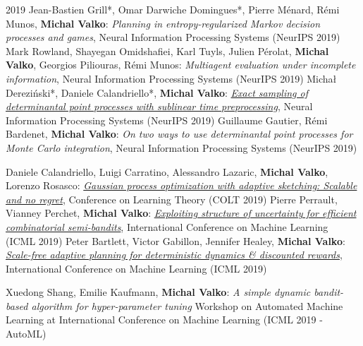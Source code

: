 \documentclass{resume}
\begin{document}
\begin{category}{2019}
\citembullet
Jean-Bastien Grill*, Omar Darwiche Domingues*, Pierre M\'enard, R\'emi Munos, {\bf Michal Valko}: \emph{Planning in entropy-regularized Markov decision processes and games}, Neural Information Processing Systems
({\sf NeurIPS 2019})
\citembullet 
Mark Rowland, Shayegan Omidshafiei, Karl Tuyls, Julien P\'erolat, {\bf Michal Valko}, Georgios Piliouras, R\'emi Munos: \emph{Multiagent evaluation under incomplete information}, Neural Information Processing Systems
({\sf NeurIPS 2019}) 
\citembullet
Micha\l{} Derezi\'nski*, Daniele Calandriello*, {\bf Michal Valko}:
\href{http://researchers.lille.inria.fr/~valko/hp/serve.php?what=publications/derezinski2019exact.pdf}{\emph{Exact sampling of determinantal point processes with sublinear time preprocessing}},
Neural Information Processing Systems
({\sf NeurIPS 2019}) 
\citembullet
Guillaume Gautier, R\' emi Bardenet, {\bf Michal Valko}:
{\emph{On two ways to use determinantal point processes for Monte Carlo integration}},
Neural Information Processing Systems
({\sf NeurIPS 2019}) 

\citembullet
Daniele Calandriello, Luigi Carratino, Alessandro Lazaric,   {\bf Michal Valko}, Lorenzo Rosasco:
\href{http://researchers.lille.inria.fr/~valko/hp/publications/calandriello2019gaussian.pdf}{\emph{Gaussian process optimization with adaptive sketching: Scalable and no regret}},
Conference on Learning Theory
({\sf COLT 2019}) 
\citembullet
Pierre Perrault, Vianney Perchet,   {\bf Michal Valko}:
\href{http://researchers.lille.inria.fr/~valko/hp/serve.php?what=publications/perrault2019exploiting.pdf}{\emph{Exploiting structure of uncertainty for efficient combinatorial semi-bandits}},
International Conference on Machine Learning
({\sf ICML 2019}) 
\citembullet
Peter Bartlett, Victor Gabillon, Jennifer Healey,    {\bf Michal Valko}:
\href{http://researchers.lille.inria.fr/~valko/hp/serve.php?what=publications/bartlett2019scale-free}{
\emph{Scale-free adaptive planning for deterministic dynamics \& discounted rewards}},
International Conference on Machine Learning
({\sf ICML 2019}) 

\citembullet
Xuedong Shang, Emilie Kaufmann, {\bf Michal Valko}:
{\emph{A simple dynamic bandit-based algorithm for hyper-parameter tuning}}
Workshop on Automated Machine Learning at International Conference on Machine Learning
({\sf ICML 2019 - AutoML}) 


\end{category}
\end{document}
